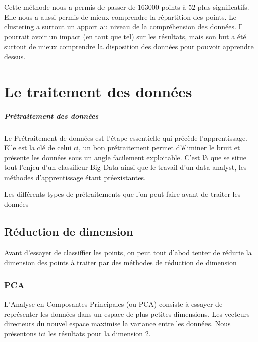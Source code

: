 \documentclass[a4paper,10pt]{report}
\begin{document}
Cette méthode nous a permis de passer de $163 000$ points à $52$ plus significatifs. Elle nous a aussi permis de mieux comprendre la répartition des points. Le clustering a surtout un apport au niveau de la compréhension des données. Il pourrait avoir un impact (en tant que tel) sur les résultats, mais son but a été surtout de mieux comprendre la disposition des données pour pouvoir apprendre dessus.
\chapter{Le traitement des données}

\paragraph{Prétraitement des données}
Le Prétraitement de données est l'étape essentielle qui précède l'apprentissage. Elle est la clé de celui ci, un bon prétraitement permet d'éliminer le bruit et présente les données sous un angle facilement exploitable. C'est là que se situe tout l'enjeu d'un classifieur Big Data ainsi que le travail d'un data analyst, les méthodes d'apprentissage étant préexistantes.  

Les différents types de prétraitements que l'on peut faire avant de traiter les données

\section{Réduction de dimension}

Avant d'essayer de classiffier les points, on peut tout d'abod tenter de rédurie la dimension des points à traiter par des méthodes de réduction de dimension
\subsection{PCA}
L'Analyse en Composantes Principales (ou PCA) consiste à essayer de représenter les données dans un espace de plus petites dimensions. Les vecteurs directeurs du nouvel espace maximise la variance entre les données. Nous présentons ici les résultats pour la dimension 2.
\end{document}

